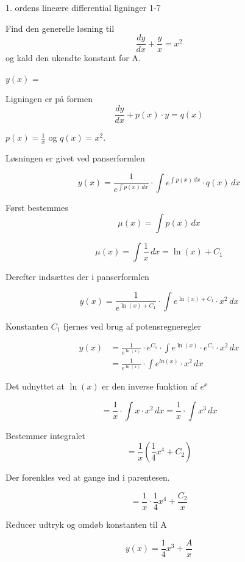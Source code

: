 \documentclass{article}
\begin{document}
\begin{exercise}{1. ordens lineære differential ligninger 1-7}
	
	
	Find den generelle løsning til
	\[
	\frac{dy}{dx} +  \frac{y}{x} = x^2
	\]
	og kald den ukendte konstant for A.
	
	$y(x)$ =   \\
	
	
	
	\hint
	
	Ligningen er på formen
	\[
	\frac{dy}{dx} + p(x) \cdot y = q(x)
	\]
	
	\hint
	
	$p(x)=\frac{1}{x}$ og $q(x)=x^2$.
	
	\hint
	
	Løsningen er givet ved panserformlen
	
	
	\hint
	
	\[
	y(x) = \frac{1}{e^{\int p(x) \, dx}} \cdot \int e^{\int p(x) \, dx}  \cdot q(x) \, dx
	\]
	
	\hint
	
	Først bestemmes 
	\[
	\mu(x) = \int p(x) \, dx
	\]
	
	\hint
	\[
	\mu(x) = \int \frac{1}{x} \, dx = \ln(x)+ C_1
	\]
	
	\hint
	Derefter indsættes der i  panserformlen
	
	\hint
	
	\[
	y(x) = \frac{1}{e^{\ln(x) + C_1}} \cdot \int e^{\ln(x) + C_1}  \cdot x^2 \, dx
	\]
	
	
	\hint
	
	Konstanten $C_1$ fjernes ved brug af potensregneregler
	
	\hint
	\begin{align*}
	y(x) &= \frac{1}{e^{\ln(x)}} \cdot e^{C_1} \cdot \int e^{\ln(x)} \cdot e^{C_1}  \cdot x^2 \, dx  \\
	&= \frac{1}{e^{\ln(x)}} \cdot \int e^{ln(x)}  \cdot x^2 \, dx
	\end{align*}
	
	\hint
	
	Det udnyttet at $\ln(x)$ er den inverse funktion af $e^x$
	
	
	\hint
	\[
	= \frac{1}{x} \cdot \int x  \cdot x^2 \, dx =  \frac{1}{x} \cdot \int  x^3 \, dx
	\]
	
	\hint
	
	Bestemmer integralet
	\[
	= \frac{1}{x} \left( \frac{1}{4}x^4 + C_2    \right)
	\]
	
	\hint
	
	Der forenkles ved at gange ind i parentesen.
	
	\hint
	\[
	= \frac{1}{x} \cdot \frac{1}{4}x^4 + \frac{C_2}{x} 
	\]
	
	\hint
	
	Reducer udtryk og omdøb konstanten til A
	
	\hint
	\[
	y(x) =  \frac{1}{4}x^3 + \frac{A}{x}
	\]
	
	
\end{exercise}
\end{document}
